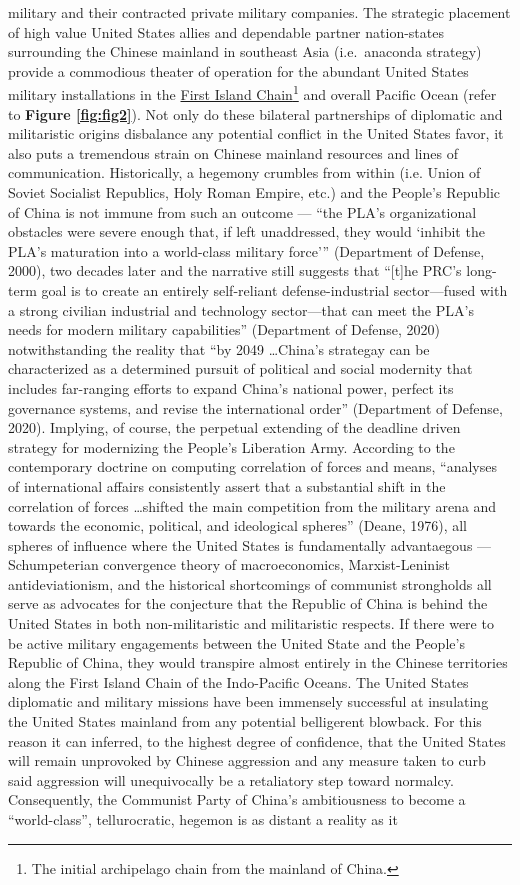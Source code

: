\documentclass[12pt]{article}
\begin{document}
military and their contracted private military companies. The strategic placement of high value United States allies and dependable partner nation-states surrounding the Chinese mainland in southeast Asia (i.e.\ anaconda strategy) provide a commodious theater of operation for the abundant United States military installations in the \underline{First Island Chain}\footnote{The initial archipelago chain from the mainland of China.} and overall Pacific Ocean (refer to \textbf{Figure \ref{fig:fig2}}). Not only do these bilateral partnerships of diplomatic and militaristic origins disbalance any potential conflict in the United States favor, it also puts a tremendous strain on Chinese mainland resources and lines of communication. Historically, a hegemony crumbles from within (i.e. Union of Soviet Socialist Republics, Holy Roman Empire, etc.) and the People's Republic of China is not immune from such an outcome — “the PLA's organizational obstacles were severe enough that, if left unaddressed, they would `inhibit the PLA's maturation into a world-class military force'” (Department of Defense, 2000), two decades later and the narrative still suggests that “[t]he PRC's long-term goal is to create an entirely self-reliant defense-industrial sector—fused with a  strong  civilian  industrial  and  technology  sector—that can meet the PLA's needs for modern military capabilities” (Department of Defense, 2020) notwithstanding the reality that “by 2049 \dots China's strategay can be characterized as a determined pursuit of political and social modernity that includes far-ranging efforts to expand China's national power, perfect its governance systems, and revise the international order” (Department of Defense, 2020). Implying, of course, the perpetual extending of the deadline driven strategy for modernizing the People's Liberation Army. According to the contemporary doctrine on computing correlation of forces and means, “analyses of international affairs consistently assert that a substantial shift in the correlation of forces \dots shifted the main competition from the military arena and towards the economic, political, and ideological spheres” (Deane, 1976), all spheres of influence where the United States is fundamentally advantaegous — Schumpeterian convergence theory of macroeconomics, Marxist-Leninist antideviationism, and the historical shortcomings of communist strongholds all serve as advocates for the conjecture that the Republic of China is behind the United States in both non-militaristic and militaristic respects. If there were to be active military engagements between the United State and the People's Republic of China, they would transpire almost entirely in the Chinese territories along the First Island Chain of the Indo-Pacific Oceans. The United States diplomatic and military missions have been immensely successful at insulating the United States mainland from any potential belligerent blowback. For this reason it can inferred, to the highest degree of confidence, that the United States will remain unprovoked by Chinese aggression and any measure taken to curb said aggression will unequivocally be a retaliatory step toward normalcy. Consequently, the Communist Party of China's ambitiousness to become a “world-class”, tellurocratic, hegemon is as distant a reality as it 
\end{document}
